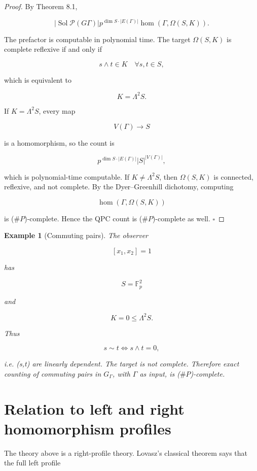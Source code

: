 \documentclass[11pt]{article}
\newtheorem{example}[theorem]{Example}
\begin{document}
\begin{proof}
By Theorem 8.1,

\[
|\operatorname{Sol}
{\mathcal P}(G
\Gamma)|
p^{\dim S\cdot |E(\Gamma)|}
\operatorname{hom}(\Gamma,\Omega(S,K)).
\]

The prefactor is computable in polynomial time. The target $\Omega(S,K)$ is complete reflexive if and only if

\[
s\wedge t\in K
\quad
\forall s,t\in S,
\]

which is equivalent to

\[
K=\Lambda^2S.
\]

If $K=\Lambda^2S$, every map

\[
V(\Gamma)\to S
\]

is a homomorphism, so the count is

\[
p^{\dim S\cdot |E(\Gamma)|}|S|^{|V(\Gamma)|},
\]

which is polynomial-time computable. If $K\ne\Lambda^2S$, then $\Omega(S,K)$ is connected, reflexive, and not complete. By the Dyer--Greenhill dichotomy, computing

\[
\operatorname{hom}(\Gamma,\Omega(S,K))
\]

is ($\#P$)-complete. Hence the QPC count is ($\#P$)-complete as well. $\square$

\end{proof}

\begin{example}[Commuting pairs]
The observer

\[
[x_1,x_2]=1
\]

has

\[
S=\mathbb F_p^2
\]

and

\[
K=0\le\Lambda^2S.
\]

Thus

\[
s\sim t
\iff s\wedge t=0,
\]

i.e. (s,t) are linearly dependent. The target is not complete. Therefore exact counting of commuting pairs in $G_\Gamma$, with $\Gamma$ as input, is ($\#P$)-complete.

\end{example}

\section{Relation to left and right homomorphism profiles}

The theory above is a right-profile theory. Lovasz's classical theorem says that the full left profile
\end{document}
